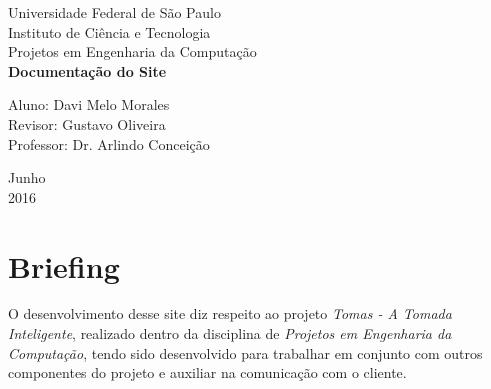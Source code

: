 \documentclass[a4paper, 12pt]{article}
\begin{document}

\begin{titlepage}
	\begin{center}


		\Huge{Universidade Federal de São Paulo}\\
		\large{Instituto de Ciência e Tecnologia}\\
		\large{Projetos em Engenharia da Computação}\\
		\vspace{15pt}
        \vspace{95pt}
        \textbf{\LARGE{Documentação do Site}}\\
		\vspace{3,5cm}
	\end{center}

	\begin{flushleft}
		\begin{tabbing}
			Aluno: Davi Melo Morales\\
            Revisor: Gustavo Oliveira\\
            Professor: Dr. Arlindo Conceição
	\end{tabbing}
 \end{flushleft}
	\vspace{1cm}

	\begin{center}
		\vspace{\fill}
			 Junho\\
		 2016
			\end{center}
\end{titlepage}

\tableofcontents

\newpage




\section{Briefing}
\label{sec:briefing}

O desenvolvimento desse site diz respeito ao projeto \textit{Tomas - A Tomada Inteligente}, realizado dentro da disciplina de \textit{Projetos em Engenharia da Computação}, tendo sido desenvolvido para trabalhar em conjunto com outros componentes do projeto e auxiliar na comunicação com o cliente.
\end{document}
